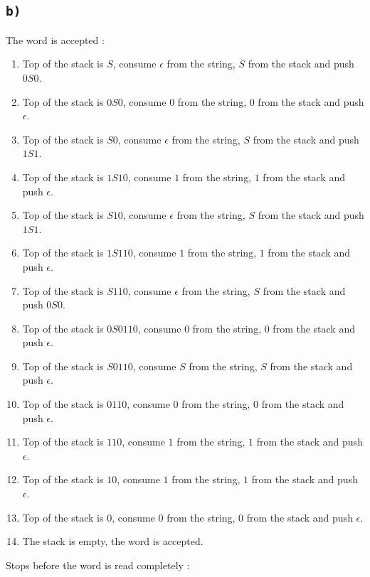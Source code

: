 \documentclass[a4paper,11pt]{report}
\begin{document}
\subsection*{\texttt{b)}}

The word is accepted :
\begin{enumerate}
\item Top of the stack is $S$, consume $\epsilon$ from the string, $S$ from the stack and push $0S0$.
\item Top of the stack is $0S0$, consume $0$ from the string, $0$ from the stack and push $\epsilon$.
\item Top of the stack is $S0$, consume $\epsilon$ from the string, $S$ from the stack and push $1S1$.
\item Top of the stack is $1S10$, consume $1$ from the string, $1$ from the stack and push $\epsilon$.
\item Top of the stack is $S10$, consume $\epsilon$ from the string, $S$ from the stack and push $1S1$.
\item Top of the stack is $1S110$, consume $1$ from the string, $1$ from the stack and push $\epsilon$.
\item Top of the stack is $S110$, consume $\epsilon$ from the string, $S$ from the stack and push $0S0$.
\item Top of the stack is $0S0110$, consume $0$ from the string, $0$ from the stack and push $\epsilon$.
\item Top of the stack is $S0110$, consume $S$ from the string, $S$ from the stack and push $\epsilon$.
\item Top of the stack is $0110$, consume $0$ from the string, $0$ from the stack and push $\epsilon$.
\item Top of the stack is $110$, consume $1$ from the string, $1$ from the stack and push $\epsilon$.
\item Top of the stack is $10$, consume $1$ from the string, $1$ from the stack and push $\epsilon$.
\item Top of the stack is $0$, consume $0$ from the string, $0$ from the stack and push $\epsilon$.
\item The stack is empty, the word is accepted.
\end{enumerate}

Stops before the word is read completely :
\end{document}
